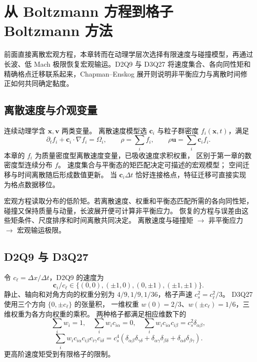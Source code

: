 \chapter{从 Boltzmann 方程到格子 Boltzmann 方法}\label{ch:15}
\begin{chaptersummary}
前面直接离散宏观方程，本章转而在动理学层次选择有限速度与碰撞模型，再通过长波、低 Mach 极限恢复宏观输运。D2Q9 与 D3Q27 将速度集合、各向同性矩和精确格点迁移联系起来，Chapman--Enskog 展开则说明非平衡应力与离散时间修正如何共同确定黏度。
\end{chaptersummary}

\section{离散速度与介观变量}
连续动理学含 $\bm x,\bm v$ 两类变量。
离散速度模型选 $\bm c_i$ 与粒子群密度 $f_i(\bm x,t)$，满足
\[
\partial_tf_i+\bm c_i\cdot\nabla f_i=\Omega_i,\qquad
\rho=\sum_i f_i,\qquad \rho\bm u=\sum_i\bm c_i f_i.
\]
本章的 $f_i$ 为质量密度型离散速度变量，已吸收速度求积权重，
区别于第一章的数密度型连续分布 $f$。
速度集合与平衡态的矩匹配决定可描述的宏观模型；
空间迁移与时间离散随后形成数值更新。
当 $\bm c_i\Delta t$ 恰好连接格点，特征迁移可直接实现为格点数据移位。

{宏观方程读取分布的低阶矩。若离散速度、权重和平衡态匹配所需的各向同性矩，
碰撞又保持质量与动量，长波展开便可计算非平衡应力。
恢复的方程与误差由这些矩条件、尺度排序和时间离散共同决定。}
{离散速度与碰撞矩 $\longrightarrow$ 非平衡应力 $\longrightarrow$ 宏观输运极限。}

\section{D2Q9 与 D3Q27}
令 $c_\ell=\Delta x/\Delta t$，D2Q9 的速度为
\[
\bm c_i/c_\ell\in\{(0,0),(\pm1,0),(0,\pm1),(\pm1,\pm1)\}.
\]
静止、轴向和对角方向的权重分别为
$4/9,1/9,1/36$，格子声速 $c_s^2=c_\ell^2/3$。
D3Q27 使用三个方向 $\{0,\pm c_\ell\}$ 的张量积，
一维权重 $w(0)=2/3$、$w(\pm c_\ell)=1/6$，三维权重为各方向权重的乘积。
两种格子都满足相应维数下的
\[
\sum_iw_i=1,\quad \sum_iw_i c_{i\alpha}=0,\quad
\sum_iw_i c_{i\alpha}c_{i\beta}=c_s^2\delta_{\alpha\beta},
\]
\[
\sum_iw_i c_{i\alpha}c_{i\beta}c_{i\gamma}c_{i\delta}
=c_s^4(\delta_{\alpha\beta}\delta_{\gamma\delta}
+\delta_{\alpha\gamma}\delta_{\beta\delta}
+\delta_{\alpha\delta}\delta_{\beta\gamma}).
\]
更高阶速度矩受到有限格子的限制。

